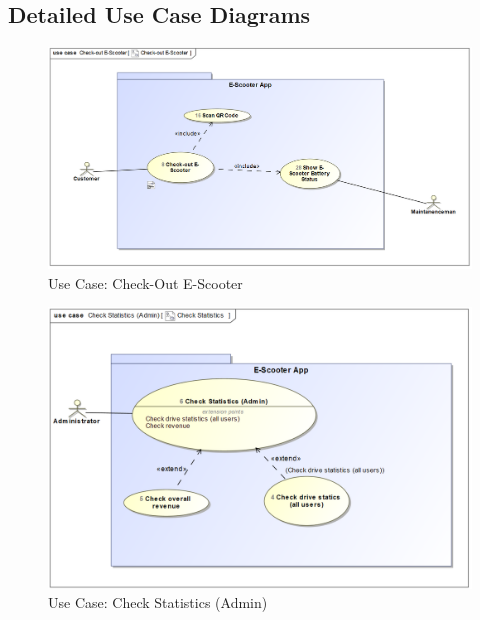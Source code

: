 \documentclass[a4paper, 12pt]{article}
\begin{document}
\subsection{Detailed Use Case Diagrams}
\begin{figure} [htbp]
  \begin{center}
    \includegraphics[scale=0.52]{images/UseCases/Check-OutE-Scooter.png}
  \end{center}
  \caption{Use Case: Check-Out E-Scooter}
\end{figure}

\begin{figure} [htbp]
  \begin{center}
    \includegraphics[scale=0.7]{images/UseCases/CheckStatistics(Admin).png}
  \end{center}
  \caption{Use Case: Check Statistics (Admin)}
\end{figure}
\end{document}
